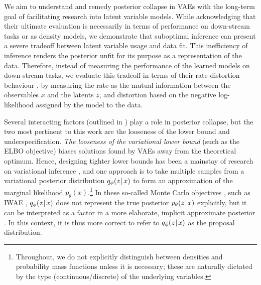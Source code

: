 We aim to understand and remedy posterior collapse in VAEs with the long-term goal of facilitating research into latent variable models.
While acknowledging that their ultimate evaluation is necessarily in terms of performance on down-stream tasks or as density models, we demonstrate that suboptimal inference can present a severe tradeoff between latent variable usage and data fit.
This inefficiency of inference renders the posterior unfit for its purpose as a representation of the data.
Therefore, instead of measuring the performance of the learned models on down-stream tasks, we evaluate this tradeoff in terms of their rate-distortion behaviour \citep{alemi2017fixing}, by measuring the rate as the mutual information between the observables $x$ and the latents $z$, and distortion based on the negative log-likelihood assigned by the model to the data.

Several interacting factors (outlined in ) play a role in posterior collapse, but the two most pertinent to this work are the looseness of the lower bound and underspecification.
\emph{The looseness of the variational lower bound} (such as the ELBO objective) biases solutions found by VAEs away from the theoretical optimum.
Hence, designing tighter lower bounds has been a mainstay of research on variational inference \citep{rezende2015variational,kingma2016improved,tomczak2018vae}, and one approach is to take multiple samples from a variational posterior distribution $q_\phi(z\hspace{0.08em}|\hspace{0.11em} x)$ to form an approximation of the marginal likelihood $p_\theta(x)$.\footnote{Throughout, we do not explicitly distinguish between densities and probability mass functions unless it is necessary; these are naturally dictated by the type (continuous/discrete) of the underlying variables.}
In these so-called Monte Carlo objectives \citep{mnih2016variational}, such as IWAE \citep{burda2015importance}, $q_\phi(z\hspace{0.08em}|\hspace{0.11em} x)$ does not represent the true posterior $p_\theta(z\hspace{0.08em}|\hspace{0.11em} x)$ explicitly, but it can be interpreted as a factor in a more elaborate, implicit approximate posterior \citep{cremer2017reinterpreting}.
In this context, it is thus more correct to refer to $q_\phi(z\hspace{0.08em}|\hspace{0.11em} x)$ as the proposal distribution.

